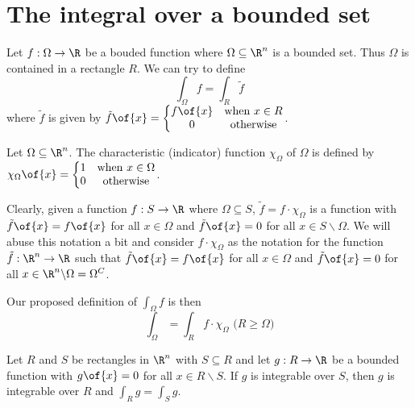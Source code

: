 \chapter{The integral over a bounded set}

Let $f: \Omega \to \R$ be a bouded function where $\Omega \subseteq \R^n$ is a bounded set. Thus $\Omega$ is contained in a rectangle $R$. We can try to define \[\int_\Omega f = \int_R \tilde{f}\] where $\tilde{f}$ is given by $\tilde{f}\of{x} = \left\{\begin{matrix} f\of{x} & \text{when } x \in R \\ 0 & \text{otherwise} \end{matrix}\right.$.

\begin{definition}
    Let $\Omega \subseteq \R^n$. The characteristic (indicator) function $\chi_\Omega$ of $\Omega$ is defined by $\chi_\Omega\of{x} = \left\{ \begin{matrix} 1 & \text{when }x \in \Omega \\ 0 & \text{otherwise} \end{matrix} \right.$.
\end{definition}

Clearly, given a function $f: S \to \R$ where $\Omega \subseteq S$, $\tilde{f} = f \cdot \chi_\Omega$ is a function with $\tilde{f}\of{x} = f\of{x}$ for all $x \in \Omega$ and $\tilde{f}\of{x} = 0$ for all $x \in S \backslash \Omega$. We will abuse this notation a bit and consider $f \cdot \chi_\Omega$ as the notation for the function $\tilde{f}: \R^n \to \R$ such that $\tilde{f}\of{x} = f\of{x}$ for all $x \in \Omega$ and $\tilde{f}\of{x} = 0$ for all $x \in \R^n \backslash \Omega = \Omega^C$.

Our proposed definition of $\int_\Omega f$ is then \[\int_\Omega = \int_R f \cdot \chi_\Omega \text{  ($R \geq \Omega$)}\]

\begin{lemma}
    Let $R$ and $S$ be rectangles in $\R^n$ with $S \subseteq R$ and let $g: R \to \R$ be a bounded function with $g\of{x} = 0$ for all $x \in R \backslash S$. If $g$ is integrable over $S$, then $g$ is integrable over $R$ and $\int_R g = \int_S g$.
\end{lemma}

